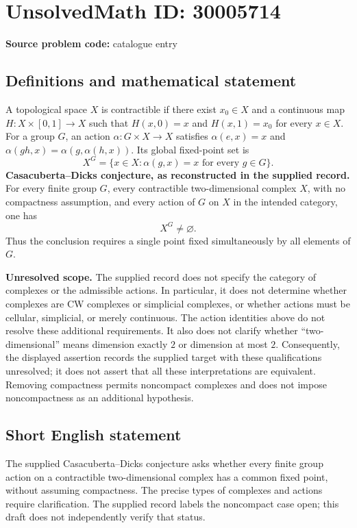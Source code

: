 \documentclass[11pt]{article}
\begin{document}
\section*{UnsolvedMath ID: 30005714}
\textbf{Source problem code:} catalogue entry
\subsection{Definitions and mathematical statement}
A topological space \(X\) is contractible if there exist \(x_0\in X\) and a continuous map \(H:X\times[0,1]\to X\) such that \(H(x,0)=x\) and \(H(x,1)=x_0\) for every \(x\in X\). For a group \(G\), an action \(\alpha:G\times X\to X\) satisfies \(\alpha(e,x)=x\) and \(\alpha(gh,x)=\alpha(g,\alpha(h,x))\). Its global fixed-point set is
\[
X^G=\{x\in X:\alpha(g,x)=x\text{ for every }g\in G\}.
\]
\textbf{Casacuberta--Dicks conjecture, as reconstructed in the supplied record.} For every finite group \(G\), every contractible two-dimensional complex \(X\), with no compactness assumption, and every action of \(G\) on \(X\) in the intended category, one has
\[
X^G\ne\varnothing.
\]
Thus the conclusion requires a single point fixed simultaneously by all elements of \(G\).

\textbf{Unresolved scope.} The supplied record does not specify the category of complexes or the admissible actions. In particular, it does not determine whether complexes are CW complexes or simplicial complexes, or whether actions must be cellular, simplicial, or merely continuous. The action identities above do not resolve these additional requirements. It also does not clarify whether ``two-dimensional'' means dimension exactly \(2\) or dimension at most \(2\). Consequently, the displayed assertion records the supplied target with these qualifications unresolved; it does not assert that all these interpretations are equivalent. Removing compactness permits noncompact complexes and does not impose noncompactness as an additional hypothesis.
\subsection{Short English statement}
The supplied Casacuberta--Dicks conjecture asks whether every finite group action on a contractible two-dimensional complex has a common fixed point, without assuming compactness. The precise types of complexes and actions require clarification. The supplied record labels the noncompact case open; this draft does not independently verify that status.
\end{document}
